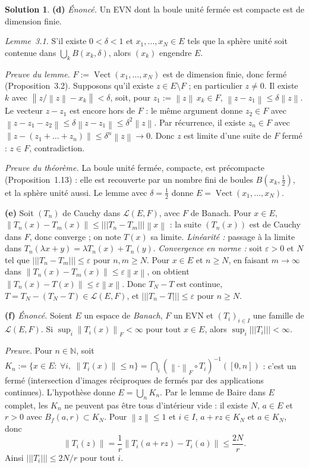 \documentclass[11pt,a4paper]{article}
\newcommand{\N}{\mathbb{N}}
\newcommand{\Vect}{\operatorname{Vect}}
\newcommand{\Bf}{B_f}
\newcommand{\norm}[1]{\left\|#1\right\|}
\newcommand{\opnorm}[1]{|\!|\!|#1|\!|\!|}
\newcommand{\Lc}{\mathcal{L}}
\theoremstyle{definition}
\newtheorem*{solution}{Solution}
\begin{document}
\begin{solution}
\medskip
\noindent\textbf{(d)} \emph{Énoncé.} Un EVN dont la boule unité fermée est compacte est de dimension finie.

\emph{Lemme~3.1.} S'il existe $0<\delta<1$ et $x_1,\dots,x_N\in E$ tels que la sphère unité soit contenue dans $\bigcup_kB(x_k,\delta)$, alors $(x_k)$ engendre $E$.

\emph{Preuve du lemme.} $F:=\Vect(x_1,\dots,x_N)$ est de dimension finie, donc fermé (Proposition~3.2). Supposons qu'il existe $z\in E\setminus F$ ; en particulier $z\ne0$. Il existe $k$ avec $\norm{z/\norm z-x_k}<\delta$, soit, pour $z_1:=\norm z\,x_k\in F$, $\norm{z-z_1}\le\delta\norm z$. Le vecteur $z-z_1$ est encore hors de $F$ : le même argument donne $z_2\in F$ avec $\norm{z-z_1-z_2}\le\delta\norm{z-z_1}\le\delta^2\norm z$. Par récurrence, il existe $z_n\in F$ avec $\norm{z-(z_1+\dots+z_n)}\le\delta^n\norm z\to0$. Donc $z$ est limite d'une suite de $F$ fermé : $z\in F$, contradiction.

\emph{Preuve du théorème.} La boule unité fermée, compacte, est précompacte (Proposition~1.13) : elle est recouverte par un nombre fini de boules $B(x_k,\frac12)$, et la sphère unité aussi. Le lemme avec $\delta=\frac12$ donne $E=\Vect(x_1,\dots,x_N)$.

\medskip
\noindent\textbf{(e)} Soit $(T_n)$ de Cauchy dans $\Lc(E,F)$, avec $F$ de Banach. Pour $x\in E$, $\norm{T_n(x)-T_m(x)}\le\opnorm{T_n-T_m}\norm x$ : la suite $(T_n(x))$ est de Cauchy dans $F$, donc converge ; on note $T(x)$ sa limite. \emph{Linéarité :} passage à la limite dans $T_n(\lambda x+y)=\lambda T_n(x)+T_n(y)$. \emph{Convergence en norme :} soit $\varepsilon>0$ et $N$ tel que $\opnorm{T_n-T_m}\le\varepsilon$ pour $n,m\ge N$. Pour $x\in E$ et $n\ge N$, en faisant $m\to\infty$ dans $\norm{T_n(x)-T_m(x)}\le\varepsilon\norm x$, on obtient $\norm{T_n(x)-T(x)}\le\varepsilon\norm x$. Donc $T_N-T$ est continue, $T=T_N-(T_N-T)\in\Lc(E,F)$, et $\opnorm{T_n-T}\le\varepsilon$ pour $n\ge N$.

\medskip
\noindent\textbf{(f)} \emph{Énoncé.} Soient $E$ un espace de \emph{Banach}, $F$ un EVN et $(T_i)_{i\in I}$ une famille de $\Lc(E,F)$. Si $\sup_i\norm{T_i(x)}_F<\infty$ pour tout $x\in E$, alors $\sup_i\opnorm{T_i}<\infty$.

\emph{Preuve.} Pour $n\in\N$, soit $K_n:=\{x\in E:\ \forall i,\ \norm{T_i(x)}\le n\}=\bigcap_i(\norm\cdot_F\circ T_i)^{-1}([0,n])$ : c'est un fermé (intersection d'images réciproques de fermés par des applications continues). L'hypothèse donne $E=\bigcup_nK_n$. Par le lemme de Baire dans $E$ complet, les $K_n$ ne peuvent pas être tous d'intérieur vide : il existe $N$, $a\in E$ et $r>0$ avec $\Bf(a,r)\subset K_N$. Pour $\norm z\le1$ et $i\in I$, $a+rz\in K_N$ et $a\in K_N$, donc
\[
\norm{T_i(z)}=\frac1r\norm{T_i(a+rz)-T_i(a)}\le\frac{2N}r .
\]
Ainsi $\opnorm{T_i}\le2N/r$ pour tout $i$.


\end{solution}
\end{document}
